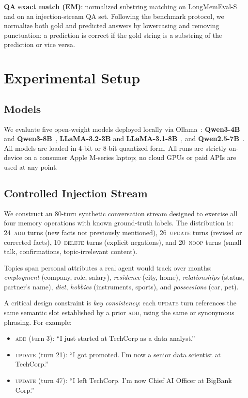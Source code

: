 \documentclass[10pt, twocolumn]{article}
\begin{document}
\textbf{QA exact match (EM)}: normalized substring matching on
LongMemEval-S~\cite{wu2024longmemeval} and on an injection-stream QA set.
Following the benchmark protocol, we normalize both gold and predicted
answers by lowercasing and removing punctuation; a prediction is correct if
the gold string is a substring of the prediction or vice versa.

\section{Experimental Setup}
\label{sec:setup}

\subsection{Models}

We evaluate five open-weight models deployed locally via
Ollama~\cite{ollama2024}:
\textbf{Qwen3-4B} and \textbf{Qwen3-8B}~\cite{qwen3},
\textbf{LLaMA-3.2-3B} and \textbf{LLaMA-3.1-8B}~\cite{llama3},
and \textbf{Qwen2.5-7B}~\cite{qwen25}.
All models are loaded in 4-bit or 8-bit quantized form.
All runs are strictly on-device on a consumer Apple M-series laptop;
no cloud GPUs or paid APIs are used at any point.

\subsection{Controlled Injection Stream}
\label{sec:stream}

We construct an 80-turn synthetic conversation stream designed to
exercise all four memory operations with known ground-truth labels.
The distribution is: 24~\textsc{add} turns (new facts not previously
mentioned), 26~\textsc{update} turns (revised or corrected facts),
10~\textsc{delete} turns (explicit negations), and 20~\textsc{noop}
turns (small talk, confirmations, topic-irrelevant content).

Topics span personal attributes a real agent would track over months:
\emph{employment} (company, role, salary), \emph{residence} (city, home),
\emph{relationships} (status, partner's name), \emph{diet},
\emph{hobbies} (instruments, sports), and \emph{possessions} (car, pet).

A critical design constraint is \emph{key consistency}: each
\textsc{update} turn references the same semantic slot established by
a prior \textsc{add}, using the same or synonymous phrasing.
For example:
\begin{itemize}[leftmargin=*, itemsep=0pt, topsep=2pt]
  \item \textsc{add} (turn 3): ``I just started at TechCorp as a data analyst.''
  \item \textsc{update} (turn 21): ``I got promoted. I'm now a senior data
    scientist at TechCorp.''
  \item \textsc{update} (turn 47): ``I left TechCorp. I'm now Chief AI
    Officer at BigBank Corp.''
\end{itemize}
\end{document}
